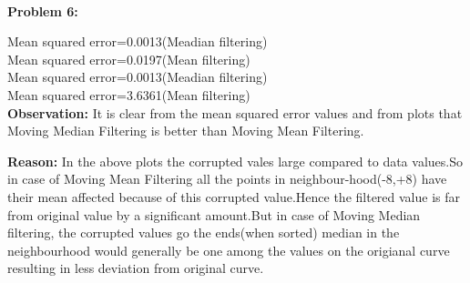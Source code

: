 \documentclass[a4paper]{article}
\begin{document}
\hrulefill \\ 
\newpage
\textbf{Problem 6:}
\graphicspath{ {/home/charith/Desktop/} }

{\centering
Mean squared error=0.0013\qquad\qquad\qquad\qquad(Meadian filtering)\\
Mean squared error=0.0197\qquad\qquad\qquad\qquad(Mean filtering)\\
}
{\centering
Mean squared error=0.0013\qquad\qquad\qquad\qquad(Meadian filtering)\\
Mean squared error=3.6361\qquad\qquad\qquad\qquad(Mean filtering)\\
} 
\textbf{Observation:} It is clear from the mean squared error values and from plots that Moving Median Filtering is better than Moving Mean Filtering.

\textbf{Reason:} In the above plots the corrupted vales large compared to data values.So in case of Moving Mean Filtering all the points in neighbour-hood(-8,+8) have their mean affected because of this corrupted value.Hence the filtered value is far from original value by a significant amount.But in case of Moving Median filtering, the corrupted values go the ends(when sorted) median in the neighbourhood would generally be one among the values on the origianal curve resulting in less deviation from original curve.      
 
\end{document}

